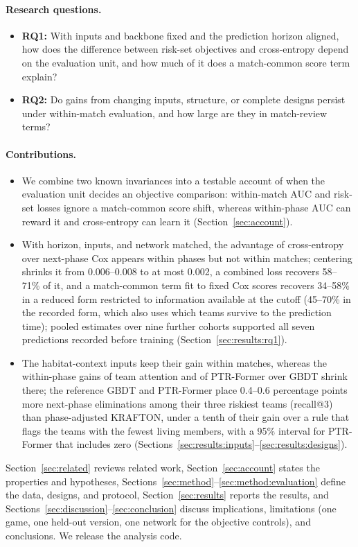 \documentclass[sigconf,anonymous,nonacm]{acmart}
\begin{document}
\paragraph{Research questions.}
\begin{itemize}
\item \textbf{RQ1:} With inputs and backbone fixed and the prediction horizon aligned, how does the difference between risk-set objectives and cross-entropy depend on the evaluation unit, and how much of it does a match-common score term explain?
\item \textbf{RQ2:} Do gains from changing inputs, structure, or complete designs persist under within-match evaluation, and how large are they in match-review terms?
\end{itemize}

\paragraph{Contributions.}
\begin{itemize}
\item We combine two known invariances into a testable account of when the evaluation unit decides an objective comparison: within-match AUC and risk-set losses ignore a match-common score shift, whereas within-phase AUC can reward it and cross-entropy can learn it (Section~\ref{sec:account}).
\item With horizon, inputs, and network matched, the advantage of cross-entropy over next-phase Cox appears within phases but not within matches; centering shrinks it from 0.006--0.008 to at most 0.002, a combined loss recovers 58--71\% of it, and a match-common term fit to fixed Cox scores recovers 34--58\% in a reduced form restricted to information available at the cutoff (45--70\% in the recorded form, which also uses which teams survive to the prediction time); pooled estimates over nine further cohorts supported all seven predictions recorded before training (Section~\ref{sec:results:rq1}).
\item The habitat-context inputs keep their gain within matches, whereas the within-phase gains of team attention and of PTR-Former over GBDT shrink there; the reference GBDT and PTR-Former place 0.4--0.6 percentage points more next-phase eliminations among their three riskiest teams (recall@3) than phase-adjusted KRAFTON, under a tenth of their gain over a rule that flags the teams with the fewest living members, with a 95\% interval for PTR-Former that includes zero (Sections~\ref{sec:results:inputs}--\ref{sec:results:designs}).
\end{itemize}
Section~\ref{sec:related} reviews related work, Section~\ref{sec:account} states the properties and hypotheses, Sections~\ref{sec:method}--\ref{sec:method:evaluation} define the data, designs, and protocol, Section~\ref{sec:results} reports the results, and Sections~\ref{sec:discussion}--\ref{sec:conclusion} discuss implications, limitations (one game, one held-out version, one network for the objective controls), and conclusions. We release the analysis code.
\end{document}
